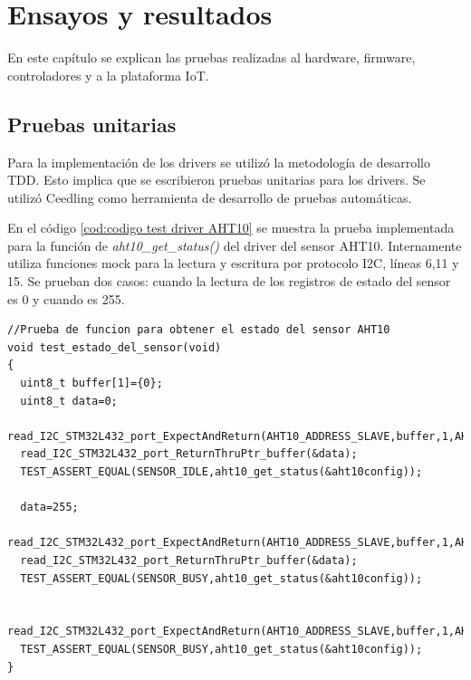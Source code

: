 
\chapter{Ensayos y resultados} %
En este capítulo se explican las pruebas realizadas al hardware, firmware, controladores y a la plataforma IoT.
\label{Chapter4} %


\section{Pruebas unitarias}
Para la implementación de los drivers se utilizó la metodología de desarrollo TDD\protect\footnotemark. Esto implica que se escribieron pruebas unitarias para los drivers. Se utilizó Ceedling como herramienta de desarrollo de pruebas automáticas.


En el código \ref{cod:codigo test driver AHT10} se muestra la prueba implementada para la función de \emph{aht10\_get\_status()} del driver del sensor AHT10. Internamente utiliza funciones mock para la lectura y escritura por protocolo I2C, líneas 6,11 y 15. 
Se prueban dos casos: cuando la lectura de los registros de estado del sensor es 0 y cuando es 255.
\begin{lstlisting}[label=cod:codigo test driver AHT10,caption=Tests del driver del sensor AHT10.]
//Prueba de funcion para obtener el estado del sensor AHT10
void test_estado_del_sensor(void)
{
  uint8_t buffer[1]={0};
  uint8_t data=0;
  read_I2C_STM32L432_port_ExpectAndReturn(AHT10_ADDRESS_SLAVE,buffer,1,AHT10_OK);
  read_I2C_STM32L432_port_ReturnThruPtr_buffer(&data);
  TEST_ASSERT_EQUAL(SENSOR_IDLE,aht10_get_status(&aht10config));
  
  data=255;
  read_I2C_STM32L432_port_ExpectAndReturn(AHT10_ADDRESS_SLAVE,buffer,1,AHT10_OK);
  read_I2C_STM32L432_port_ReturnThruPtr_buffer(&data);
  TEST_ASSERT_EQUAL(SENSOR_BUSY,aht10_get_status(&aht10config));
  
  read_I2C_STM32L432_port_ExpectAndReturn(AHT10_ADDRESS_SLAVE,buffer,1,AHT10_ERROR);
  TEST_ASSERT_EQUAL(SENSOR_BUSY,aht10_get_status(&aht10config)); 
}
\end{lstlisting}

